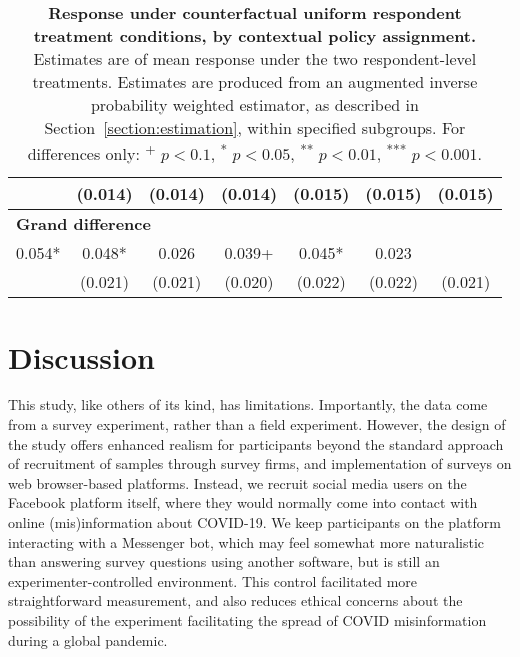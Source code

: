 \documentclass[letterpaper, 12pt, parskip=full,DIV=10]{scrartcl}
\begin{document}
\begin{table}[H]
\begin{tabular}{lcccccc}
 & (\num{0.014}) & (\num{0.014}) & (\num{0.014}) & (\num{0.015}) & (\num{0.015}) & (\num{0.015})\\
\hline
\multicolumn{4}{l}{\textbf{Grand difference}} \rule{0pt}{1.2\normalbaselineskip} \\
  \num{0.054}* & \num{0.048}* & \num{0.026} & \num{0.039}+ & \num{0.045}* & \num{0.023}\\
 & (\num{0.021}) & (\num{0.021}) & (\num{0.020}) & (\num{0.022}) & (\num{0.022}) & (\num{0.021})\\
   \end{tabular}
   \caption{\textbf{Response under counterfactual uniform respondent treatment conditions, by contextual policy assignment.} Estimates are of mean response under the two respondent-level treatments. Estimates are produced from an augmented inverse probability weighted estimator, as described in Section~\ref{section:estimation}, within specified subgroups. For differences only: \textsuperscript{+} $p<0.1$, \textsuperscript{*} $p < 0.05$, \textsuperscript{**} $p < 0.01$, \textsuperscript{***} $p < 0.001$.}
   \label{tab:heterogeneity_best}
\end{table}






\section{Discussion}

This study, like others of its kind, has limitations. Importantly, the data come from a survey experiment, rather than a field experiment. However, the design of the study offers enhanced realism for participants beyond the standard approach of recruitment of samples through survey firms, and implementation of surveys on web browser-based platforms. Instead, we recruit social media users on the Facebook platform itself, where they would normally come into contact with online (mis)information about COVID-19. We keep participants on the platform interacting with a Messenger bot, which may feel somewhat more naturalistic than answering survey questions using another software, but is still an experimenter-controlled environment. This control facilitated more straightforward measurement, and also reduces ethical concerns about the possibility of the experiment facilitating the spread of COVID misinformation during a global pandemic. 
\end{document}

